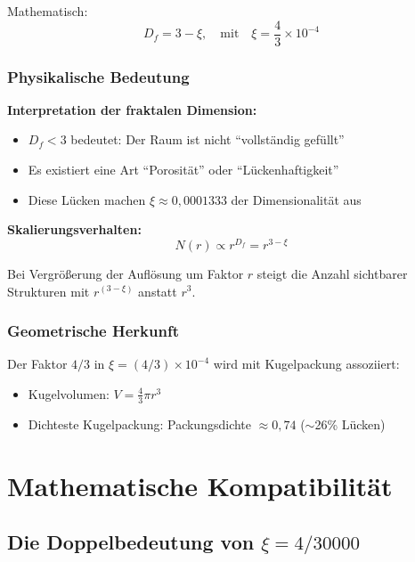 	Mathematisch:
	\begin{equation}
		\boxed{D_f = 3 - \xi, \quad \text{mit} \quad \xi = \frac{4}{3} \times 10^{-4}}
	\end{equation}
	
	\subsubsection{Physikalische Bedeutung}
	
	\textbf{Interpretation der fraktalen Dimension:}
	\begin{itemize}
		\item $D_f < 3$ bedeutet: Der Raum ist nicht \enquote{vollständig gefüllt}
		\item Es existiert eine Art \enquote{Porosität} oder \enquote{Lückenhaftigkeit}
		\item Diese Lücken machen $\xi \approx 0{,}0001333$ der Dimensionalität aus
	\end{itemize}
	
	\textbf{Skalierungsverhalten:}
	\begin{equation}
		N(r) \propto r^{D_f} = r^{3-\xi}
	\end{equation}
	
	Bei Vergrößerung der Auflösung um Faktor $r$ steigt die Anzahl sichtbarer Strukturen mit $r^{(3-\xi)}$ anstatt $r^3$.
	
	\subsubsection{Geometrische Herkunft}
	
	Der Faktor $4/3$ in $\xi = (4/3) \times 10^{-4}$ wird mit Kugelpackung assoziiert:
	\begin{itemize}
		\item Kugelvolumen: $V = \frac{4}{3}\pi r^3$
		\item Dichteste Kugelpackung: Packungsdichte $\approx 0{,}74$ ($\sim$26\% Lücken)
	\end{itemize}
	
	\section{Mathematische Kompatibilität}
	
	\subsection{Die Doppelbedeutung von $\xi = 4/30000$}
	
